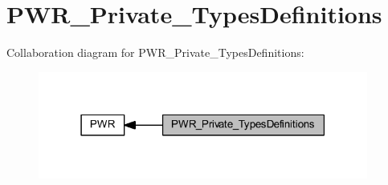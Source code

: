 \hypertarget{group___p_w_r___private___types_definitions}{}\section{P\+W\+R\+\_\+\+Private\+\_\+\+Types\+Definitions}
\label{group___p_w_r___private___types_definitions}
Collaboration diagram for P\+W\+R\+\_\+\+Private\+\_\+\+Types\+Definitions\+:
\nopagebreak
\begin{figure}[H]
\begin{center}
\leavevmode
\includegraphics[width=307pt]{group___p_w_r___private___types_definitions}
\end{center}
\end{figure}
